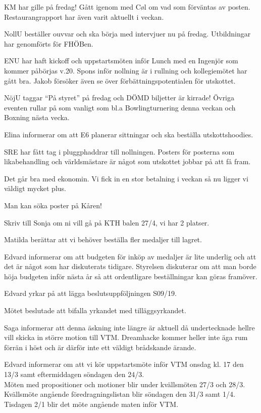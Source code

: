 \documentclass[10pt]{article}
\begin{document}
\begin{paragrafer}
\begin{paragrafer}
KM har gille på fredag! Gått igenom med Cøl om vad som förväntas av posten. Restaurangrapport har även varit aktuellt i veckan.

NollU beställer ouvvar och ska börja med intervjuer nu på fredag. Utbildningar har genomförts för FHÖBen.

ENU har haft kickoff och uppstartsmöten inför Lunch med en Ingenjör som kommer påbörjas v.20. Spons inför nollning är i rullning och kollegiemötet har gått bra. Jakob försöker även se över förbättningspotentialen för utskottet.

NöjU taggar ``På styret'' på fredag och DÖMD biljetter är kirrade! Övriga eventen rullar på som vanligt som bl.a Bowlingturnering denna veckan och Boxning nästa vecka. 

Elina informerar om att E6 planerar sittningar och ska beställa utskottshoodies.

SRE har fått tag i pluggphaddrar till nollningen. Posters för posterna som likabehandling och världsmästare är något som utskottet jobbar på att få fram.


Det går bra med ekonomin. Vi fick in en stor betalning i veckan så nu ligger vi väldigt mycket plus.

Man kan söka poster på Kåren! 

Skriv till Sonja om ni vill gå på KTH balen 27/4, vi har 2 platser. 
\end{paragrafer}

Matilda berättar att vi behöver beställa fler medaljer till lagret. 

Edvard informerar om att budgeten för inköp av medaljer är lite underlig och att det är något som har diskuterats tidigare.
Styrelsen diskuterar om att man borde höja budgeten inför nästa år så att ordentligare beställningar kan göras framöver.

Edvard yrkar på att lägga beslutsuppföljningen S09/19.

Mötet beslutade att bifalla yrkandet med tilläggsyrkandet.

Saga informerar att denna äskning inte längre är aktuell då undertecknade hellre vill skicka in större motion till VTM. Dreamhacke kommer heller inte äga rum förrän i höst och är därför inte ett väldigt brådskande ärande. 

Edvard informerar om att vi kör uppstartsmöte inför VTM onsdag kl. 17 den 13/3 samt eftermiddagen söndagen den 24/3. \\
Möten med propositioner och motioner blir under kvällsmöten 27/3 och 28/3. \\
Kvällsmöte angående föredragningslistan blir söndagen den 31/3 samt 1/4. \\
Tisdagen 2/1 blir det möte angående maten inför VTM.


\end{paragrafer}
\end{document}
